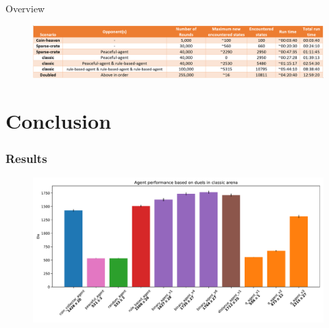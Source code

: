 \documentclass{beamer}
\begin{document}
\begin{frame}{Overview}
	\pause
	\begin{figure}[t]
			\centering
			\includegraphics[width=.8\linewidth]{table.png}
	\end{figure}
\end{frame}

\section{Conclusion}

\begin{frame}[fragile]
	\frametitle{Results}
	\pause

	\begin{figure}[t]
			\centering
			\includegraphics[width=1\linewidth]{elo.pdf}
	\end{figure}
\end{frame}
\end{document}
